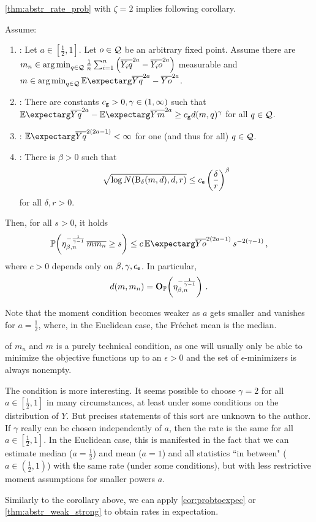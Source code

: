 \autoref{thm:abstr_rate_prob} with $\zeta=2$ implies following corollary.
%
\begin{corollary}\label{coro:probrates_power}
	Assume:
	\begin{enumerate}[label=\environmentEnumerateLabel]
	\item
		:	Let $a\in[\frac12,1]$. Let $o\in\mathcal{Q}$ be an arbitrary fixed point. Assume there are $m_n\in\operatorname*{arg\,min}_{q\in\mathcal{Q}} \frac1n\sum_{i=1}^n \left( \overline{Y_iq}^{2a}-\overline{Y_io}^{2a} \right)$ measurable and $m\in\argmin_{q\in\mc Q} \Ex{\ol Yq^{2a}-\ol Yo^{2a}}$.
	\item 
		: There are constants $c_{\mathsf{g}} > 0, \gamma\in(1,\infty)$ such that 
				$\Ex{\ol Yq^{2a}}-\Ex{\ol Ym^{2a}}  \geq c_{\ms g} d(m,q)^\gamma$ for all $q\in\mathcal{Q}$.
	\item {}:   $\Ex{\ol{Y}{q}^{2(2a-1)}} < \infty$ for one (and thus for all) $q\in\mathcal{Q}$.
	\item {}: 
		There is $\beta > 0$ such that
		\begin{equation*}
			\sqrt{\log N(\operatorname{\mathrm{B}}_\delta(m, d), d, r)} \leq c_{\mathsf{e}} \left( \frac{\delta}{r} \right)^\beta
		\end{equation*}
		for all $\delta, r > 0$.
	\end{enumerate}
	Then, for all $s > 0$, it holds
	\begin{equation*}
		\PrOf{\eta_{\beta,n}^{-\frac1{\gamma-1}}\, \ol{m}{m_n} \geq s} \leq c \,\Ex{\ol{Y}{o}^{2(2a-1)}} \, s^{-2(\gamma-1)}
		\eqcm
	\end{equation*}
	where $c > 0$ depends only on $\beta, \gamma, c_{\mathsf{e}}$.
	In particular,
	\begin{equation*}
		d(m, m_n) = \mathbf{O}_{\mathbb{P}}\!\left( \eta_{\beta,n}^{-\frac1{\gamma-1}} \right)
		\, .
	\end{equation*}
\end{corollary}
%
Note that the moment condition becomes weaker as $a$ gets smaller and vanishes for $a=\frac12$, where, in the Euclidean case, the Fréchet mean is the median. 

 of $m_n$ and $m$ is a purely technical condition, as one will usually only be able to minimize the objective functions up to an $\epsilon>0$ and the set of $\epsilon$-minimizers is always nonempty.

The  condition is more interesting. It seems possible to choose $\gamma=2$ for all $a\in[\frac12,1]$ in many circumstances, at least under some conditions on the distribution of $Y$. But precises statements of this sort are unknown to the author. If $\gamma$ really can be chosen independently of $a$, then the rate is the same for all $a\in[\frac12,1]$. In the Euclidean case, this is manifested in the fact that we can estimate median ($a = \frac12$) and mean ($a = 1$) and all statistics ``in between" ($a \in (\frac12,1)$) with the same rate (under some conditions), but with less restrictive moment assumptions for smaller powers $a$.

Similarly to the corollary above, we can apply \autoref{cor:probtoexpec} or \autoref{thm:abstr_weak_strong} to obtain rates in expectation.
%
%
%
%
%